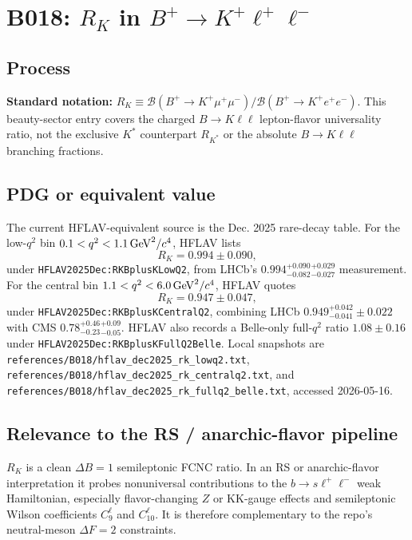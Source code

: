 
\section{B018: \(R_K\) in \(B^+\to K^+\ell^+\ell^-\)}

\subsection*{Process}
\textbf{Standard notation:} \(R_K\equiv
\mathcal B(B^+\to K^+\mu^+\mu^-)/\mathcal B(B^+\to K^+e^+e^-)\).
This beauty-sector entry covers the charged \(B\to K\ell\ell\) lepton-flavor
universality ratio, not the exclusive \(K^*\) counterpart \(R_{K^*}\) or the
absolute \(B\to K\ell\ell\) branching fractions.

\subsection*{PDG or equivalent value}
The current HFLAV-equivalent source is the Dec. 2025 rare-decay table.  For
the low-\(q^2\) bin \(0.1<q^2<1.1\,{\rm GeV}^2/c^4\), HFLAV lists
\[
  R_K = 0.994\pm0.090,
\]
under \texttt{HFLAV2025Dec:RKBplusKLowQ2}, from LHCb's
\(0.994^{+0.090}_{-0.082}{}^{+0.029}_{-0.027}\) measurement.  For the central
bin \(1.1<q^2<6.0\,{\rm GeV}^2/c^4\), HFLAV quotes
\[
  R_K = 0.947\pm0.047,
\]
under \texttt{HFLAV2025Dec:RKBplusKCentralQ2}, combining LHCb
\(0.949^{+0.042}_{-0.041}\pm0.022\) with CMS
\(0.78^{+0.46}_{-0.23}{}^{+0.09}_{-0.05}\).  HFLAV also records a Belle-only
full-\(q^2\) ratio \(1.08\pm0.16\) under
\texttt{HFLAV2025Dec:RKBplusKFullQ2Belle}.  Local snapshots are
\texttt{references/B018/hflav\_dec2025\_rk\_lowq2.txt},
\texttt{references/B018/hflav\_dec2025\_rk\_centralq2.txt}, and
\texttt{references/B018/hflav\_dec2025\_rk\_fullq2\_belle.txt}, accessed
2026-05-16.

\subsection*{Relevance to the RS / anarchic-flavor pipeline}
\(R_K\) is a clean \(\Delta B=1\) semileptonic FCNC ratio.  In an RS or
anarchic-flavor interpretation it probes nonuniversal contributions to the
\(b\to s\ell^+\ell^-\) weak Hamiltonian, especially flavor-changing \(Z\) or
KK-gauge effects and semileptonic Wilson coefficients \(C_9^{\ell}\) and
\(C_{10}^{\ell}\).  It is therefore complementary to the repo's neutral-meson
\(\Delta F=2\) constraints.

